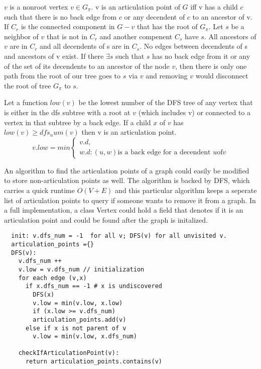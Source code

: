 \documentclass[titlepage]{article}\usepackage[]{graphicx}\usepackage[]{color}
\begin{document}
  $v$ is a nonroot vertex $v \in G_\pi$. v is an articulation point of $G$ iff v
  has a child $c$ such that there is no back edge from $c$ or any decendent of
  $c$ to an ancestor of v. If $C_r$ is the connected component in $G - v $ that
  has the root of $G_\pi$. Let $s$ be a neighbor of $v$ that is not in $C_r$ and
  another compenent $C_s$ have $s$. All ancestors of $v$ are in $C_r$ and all
  decendents of s are in $C_s$. No edges between decendents of s and ancestors of
  v exist. If there $\exists s$ such that $s$ has no back edge from it or any of
  the set of its decendents to an ancestor of the node $v$, then there is only
  one path from the root of our tree goes to $s$ via $v$ and removing $v$ would
  disconnect the root of tree $G_\pi$ to $s$.

  Let a function $low(v)$ be the lowest number of the DFS tree of any vertex
  that is either in the dfs subtree with a root at $v$ (which includes v) or
  connected to a vertex in that subtree by a back edge. If a child $x$ of $v$
  has $low(v) \geq dfs_num(v)$ then v is an articulation point. 
\[
  v.low = min 
  \begin{cases}
	v.d, \\
        w.d: (u,w) \text{is a back edge for a decendent } u \text{of} v
  \end{cases}
\]


  An algorithm to find the articulation points of a graph could easily be
  modified to store non-articulation points as well. The algorithm is backed by
  DFS, which carries a quick runtime $O(V+E)$ and this particular algorithm
  keeps a seperate list of articulation points to query if someone wants to
  remove it from a graph. In a full implementation, a class Vertex could hold a
  field that denotes if it is an articulation point and could be found after
  the graph is initalized. 

  \begin{lstlisting}
  init: v.dfs_num = -1  for all v; DFS(v) for all unvisited v.
  articulation_points ={}
  DFS(v):
    v.dfs_num ++
    v.low = v.dfs_num // initialization
    for each edge (v,x)
      if x.dfs_num == -1 # x is undiscovered
        DFS(x)
        v.low = min(v.low, x.low)
        if (x.low >= v.dfs_num)
        articulation_points.add(v)
      else if x is not parent of v
        v.low = min(v.low, x.dfs_num)

    checkIfArticulationPoint(v):
      return articulation_points.contains(v)
  \end{lstlisting}
\end{document}
